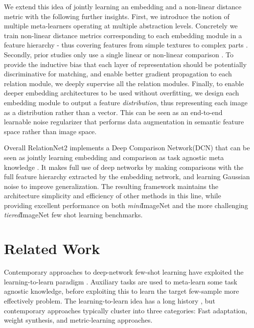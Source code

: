 \documentclass[conference]{IEEEtran}
\def\modelname{Deep Comparison Network\xspace}
\def\modelnameshort{DCN}
\def\modelnamefull{\modelname (\modelnameshort)\xspace}
\def\tierIN{\textit{tiered}ImageNet}
\def\miniIN{\textit{mini}ImageNet}
\newcommand{\cut}[1]{}
\begin{document}
We extend this idea of jointly learning an embedding and a non-linear distance metric with the following further insights. 
First, we introduce the notion of multiple meta-learners operating at multiple abstraction levels\cut{, where multiple layers of features have been used in other problems but just fused into a single classifier \cite{hariharan2015hypercolumn} or one shallow classifier per layer \cite{lee2015deepSupNet}}.
Concretely we train non-linear distance metrics corresponding to each embedding module in a feature hierarchy - thus covering features from simple textures to complex parts \cite{zeiler2014understandingCNN}.
Secondly, prior studies only use a single linear \cite{snell2017prototypical} or non-linear comparison \cite{yang2018learning}.
To provide the inductive bias that each layer of representation should be potentially discriminative for matching, and enable better gradient propagation \cite{huang2017densely} to each relation module, we deeply supervise \cite{lee2015deepSupNet} all the relation modules. Finally, to enable deeper embedding architectures to be used without overfitting, we design each embedding module to output a feature \emph{distribution}, thus representing each image as a distribution rather than a vector. This can be seen as an end-to-end learnable noise regularizer that performs data augmentation in semantic feature space rather than image space.

Overall RelationNet2 implements a \modelnamefull{} that can be seen as jointly learning embedding and comparison as task agnostic meta knowledge \cite{vinyals2016matching,snell2017prototypical,yang2018learning,hospedales2020metaSurvey}. It makes full use of deep networks by making comparisons with the full feature hierarchy extracted by the embedding network, and learning Gaussian noise to improve generalization. The resulting framework maintains the architecture simplicity and efficiency of other methods in this line, while providing excellent performance on both \miniIN{} and the more challenging \tierIN{} few shot learning benchmarks.

\section{Related Work}
Contemporary approaches to deep-network few-shot learning have exploited the learning-to-learn paradigm \cite{hospedales2020metaSurvey}. Auxiliary tasks are used to meta-learn some task agnostic knowledge, before exploiting this to learn the target few-sample more effectively problem. The learning-to-learn idea has a long history \cite{thrun1996lll,fei2006one,lake2015ppi}, but contemporary approaches typically cluster into three categories: Fast adaptation, weight synthesis, and metric-learning approaches. 
\end{document}
